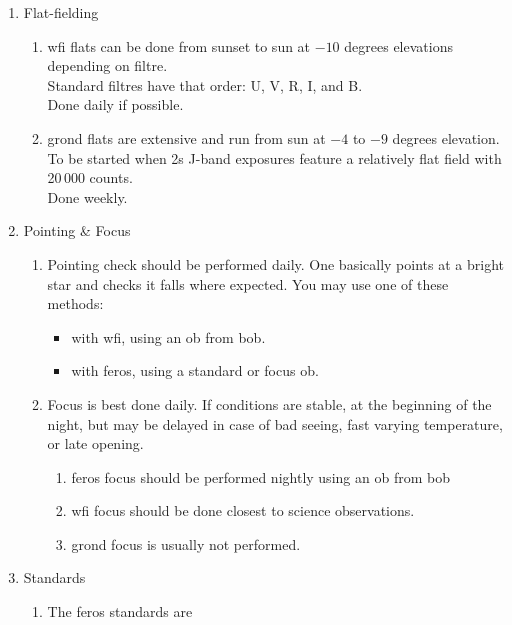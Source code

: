 \documentclass[11pt,fleqn]{book}
\begin{document}
\begin{enumerate}
    \item Flat-fielding
    \begin{enumerate}
        \item \gls{wfi} flats can be done from sunset to sun at $-10$ degrees elevations depending on filtre.\\
        Standard filtres have that order: U, V, R, I, and B.\\
        Done daily if possible.
        \item \gls{grond} flats are extensive and run from sun at $-4$ to $-9$ degrees elevation.\\
        To be started when 2s J-band exposures feature a
        relatively flat field with 20\,000 counts.\\
        Done weekly.
    \end{enumerate}
    \item Pointing \& Focus
    \begin{enumerate}
        \item Pointing check should be performed daily.  One basically points at
        a bright star and checks it falls where expected.  You may use
        one of these methods:
        \begin{itemize} 
            \item with \gls{wfi}, using an \gls{ob} from \gls{bob}.
            \item with \gls{feros}, using a standard or focus \gls{ob}.
        \end{itemize}
        \item Focus is best done daily.  If conditions are stable, at the beginning of the night, but may be delayed in case of bad seeing, fast varying temperature, or late opening.  
        \begin{enumerate}
            \item \gls{feros} focus should be performed nightly using an \gls{ob} from \gls{bob}
            \item \gls{wfi} focus should be done closest to science observations.
            \item \gls{grond} focus is usually not performed.
        \end{enumerate}
    \end{enumerate} 
    \item Standards
    \begin{enumerate}
        \item The \gls{feros} standards are

\end{enumerate}
\end{enumerate}
\end{document}
